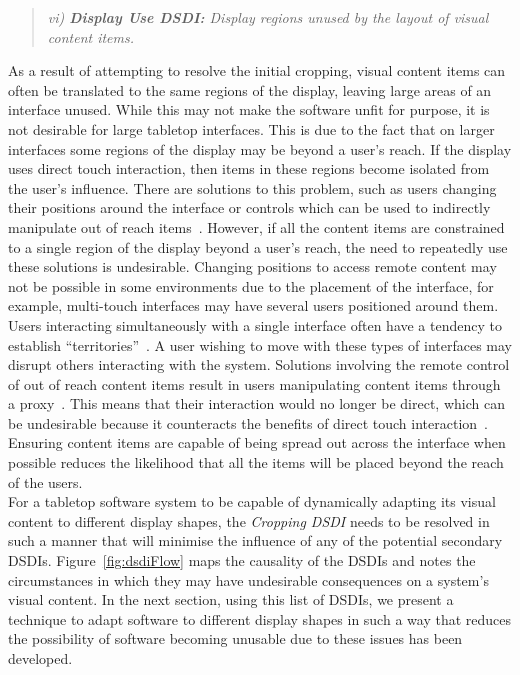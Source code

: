 \documentclass[twocolumn,compsoc]{cvm}
\begin{document}
\begin{quote}\emph{vi) \textbf{Display Use \ac{DSDI}:} Display regions unused by the layout of visual content items.}\end{quote}

As a result of attempting to resolve the initial cropping, visual content items can often be translated to the same regions of the display, leaving large areas of an interface unused.
While this may not make the software unfit for purpose, it is not desirable for large tabletop interfaces.
This is due to the fact that on larger interfaces some regions of the display may be beyond a user's reach.
If the display uses direct touch interaction, then items in these regions become isolated from the user's influence.
There are solutions to this problem, such as users changing their positions around the interface or controls which can be used to indirectly manipulate out of reach items~\cite{Ryall2006a}.
However, if all the content items are constrained to a single region of the display beyond a user's reach, the need to repeatedly use these solutions is undesirable.
Changing positions to access remote content may not be possible in some environments due to the placement of the interface, for example, multi-touch interfaces may have several users positioned around them.
Users interacting simultaneously with a single interface often have a tendency to establish ``territories''~\cite{scott2004}.
A user wishing to move with these types of interfaces may disrupt others interacting with the system.
Solutions involving the remote control of out of reach content items result in users manipulating content items through a proxy~\cite{Smith11}.
This means that their interaction would no longer be direct, which can be undesirable because it counteracts the benefits of direct touch interaction~\cite{Schoning2008}.
Ensuring content items are capable of being spread out across the interface when possible reduces the likelihood that all the items will be placed beyond the reach of the users.\\

For a tabletop software system to be capable of dynamically adapting its visual content to different display shapes, the {\emph{Cropping \ac{DSDI}}} needs to be resolved in such a manner that will minimise the influence of any of the potential secondary \acp{DSDI}.
Figure~\ref{fig:dsdiFlow} maps the causality of the \acp{DSDI} and notes the circumstances in which they may have undesirable consequences on a system's visual content.
In the next section, using this list of \acp{DSDI}, we present a technique to adapt software to different display shapes in such a way that reduces the possibility of software becoming unusable due to these issues has been developed.
\end{document}
